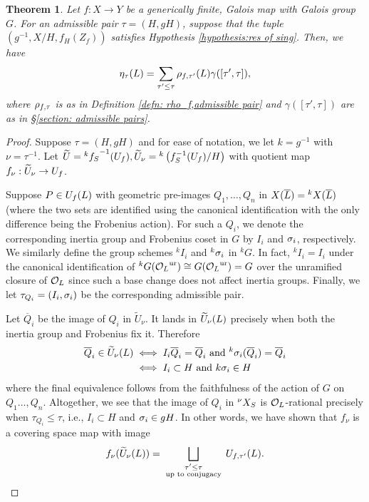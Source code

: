 \documentclass[10pt]{article}
\theoremstyle{plain}
\newtheorem{thm}[theorem]{Theorem}
\theoremstyle{definition}
\numberwithin{equation}{section}
\begin{document}
\begin{thm}\label{thm: incidence identity}
Let $f:X\to Y$ be a generically finite, Galois map with Galois group $G$. For an admissible pair $\tau = (H,gH)$, suppose that the tuple $(g^{-1},X/H,f_H(Z_f))$ satisfies Hypothesis \ref{hypothesis:res of sing}. Then, we have
\begin{equation}\label{eqn: incidence identity}
     {\eta_{\tau}({L})} = \sum_{\tau' \leq \tau}\rho_{f,\tau'}({L})\gamma([\tau',\tau]),
\end{equation}
where $\rho_{f,\tau}$ is as in Definition \ref{defn: rho_f,admissible pair} and $\gamma([\tau',\tau])$ are as in \S\ref{section: admissible pairs}.
\end{thm}
\begin{proof}
Suppose $\tau = (H,gH)$ and for ease of notation, we let $k = g^{-1}$ with $\nu = \tau^{-1}$. Let $\widetilde{U} = {^k f_{S}}^{-1}(U_f), \widetilde{U}_\nu = {^k\left( f_{S}^{-1}(U_f)/H\right)}$ with quotient map $f_\nu: \widetilde{U}_\nu \to U_f$.

Suppose $P \in U_f({L})$ with geometric pre-images $Q_1,\dots,Q_n$ in $X(\overline{{L}}) = {^kX}(\overline{{L}})$ (where the two sets are identified using the canonical identification with the only difference being the Frobenius action). For such a $Q_i$, we denote the corresponding inertia group and Frobenius coset in $G$ by $I_i$ and $\sigma_i$, respectively. We similarly define the group schemes ${^kI}_i$ and ${^k\sigma_i}$ in $^k G$. In fact, ${^kI}_i = I_i$ under the canonical identification of ${^kG}({{\mathcal O}_{L}}^{\mathrm{ur}}) \cong G({{\mathcal O}_{L}}^{\mathrm{ur}}) = G$ over the unramified closure of ${{\mathcal O}_{L}}$ since such a base change does not affect inertia groups. Finally, we let $\tau_{Q_i} = (I_i,\sigma_i)$ be the corresponding admissible pair. 

Let $\overline{Q}_i$ be the image of $Q_i$ in $\widetilde{U}_\nu$. It lands in $\widetilde{U}_\nu({L})$ precisely when both the inertia group and Frobenius fix it. Therefore
\begin{align*}
    \overline{Q}_i \in \widetilde{U}_\nu({L}) &\iff I_i\overline{Q}_i = \overline{Q}_i \text{ and } {^k\sigma_i}(\overline{Q}_i) = \overline{Q}_i\\ 
    &\iff I_i \subset H \text{ and } k\sigma_i \in H
\end{align*}
where the final equivalence follows from the faithfulness of the action of $G$ on $Q_1\dots,Q_n$. Altogether, we see that the image of $Q_i$ in ${^\nu X_{S}}$ is ${{\mathcal O}_{L}}$-rational precisely when $\tau_{Q_i} \leq \tau$, i.e., $I_i \subset H$ and $\sigma_i \in gH$. In other words, we have shown that $f_\nu$ is a covering space map with image 
\[f_\nu(\widetilde{U}_\nu({L})) = \bigsqcup_{\substack{\tau' \leq \tau\\\text{ up to conjugacy }}}U_{f,\tau'}({L}).\]


\end{proof}
\end{document}
